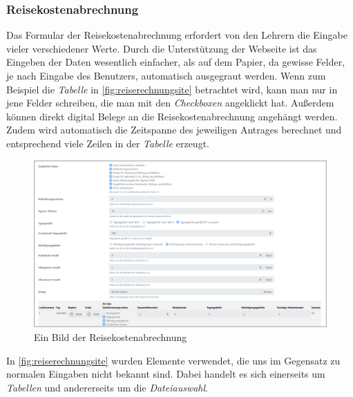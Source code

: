\subsubsection{Reisekostenabrechnung}
\label{chapter:implementierung-frontend-komponenten-rechnung}
Das Formular der Reisekostenabrechnung erfordert von den Lehrern die Eingabe vieler verschiedener Werte. Durch die Unterstützung der Webseite ist das Eingeben der Daten wesentlich einfacher, als auf dem Papier, da gewisse Felder, je nach Eingabe des Benutzers, automatisch ausgegraut werden. Wenn zum Beispiel die \textit{Tabelle} in \autoref{fig:reiserechnungsite} betrachtet wird, kann man nur in jene Felder schreiben, die man mit den \textit{Checkboxen} angeklickt hat. Außerdem können direkt digital Belege an die Reisekostenabrechnung angehängt werden. Zudem wird automatisch die Zeitspanne des jeweiligen Antrages berechnet und entsprechend viele Zeilen in der \textit{Tabelle} erzeugt.
\begin{figure}[H]
	\centering
	\includegraphics[width=1\linewidth]{images/ldehner_implementierung/reiserechnung_1}
	\caption[Reisekostenabrechnung]{Ein Bild der Reisekostenabrechnung}
	\label{fig:reiserechnungsite}
\end{figure}
In \autoref{fig:reiserechnungsite} wurden Elemente verwendet, die uns im Gegensatz zu normalen Eingaben nicht bekannt sind. Dabei handelt es sich einerseits um \textit{Tabellen} und andererseits um die \textit{Dateiauswahl}.

